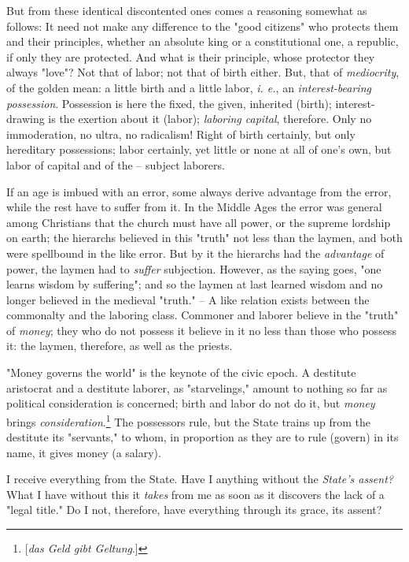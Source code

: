 But from these identical discontented ones comes a reasoning somewhat as 
follows: It need not make any difference to the "{}good citizens"{} who 
protects them and their principles, whether an absolute king or a 
constitutional one, a republic, if only they are protected. And what is their 
principle, whose protector they always "{}love"{}? Not that of labor; not that 
of birth either. But, that of \textit{mediocrity}, of the golden mean: a 
little birth and a little labor, \textit{i. e.}, an \textit{interest-bearing 
possession}. Possession is here the fixed, the given, inherited (birth); 
interest-drawing is the exertion about it (labor); \textit{laboring capital}, 
therefore. Only no immoderation, no ultra, no radicalism! Right of birth 
certainly, but only hereditary possessions; labor certainly, yet little or 
none at all of one's own, but labor of capital and of the -- subject laborers.

If an age is imbued with an error, some always derive advantage from the 
error, while the rest have to suffer from it. In the Middle Ages the error was 
general among Christians that the church must have all power, or the supreme 
lordship on earth; the hierarchs believed in this "{}truth"{} not less than 
the laymen, and both were spellbound in the like error. But by it the 
hierarchs had the \textit{advantage} of power, the laymen had to 
\textit{suffer} subjection. However, as the saying goes, "{}one learns wisdom 
by suffering"{}; and so the laymen at last learned wisdom and no longer 
believed in the medieval "{}truth."{} -- A like relation exists between the 
commonalty and the laboring class. Commoner and laborer believe in the 
"{}truth"{} of \textit{money}; they who do not possess it believe in it no 
less than those who possess it: the laymen, therefore, as well as the priests.

"{}Money governs the world"{} is the keynote of the civic epoch. A destitute 
aristocrat and a destitute laborer, as "{}starvelings,"{} amount to nothing so 
far as political consideration is concerned; birth and labor do not do it, but 
\textit{money} brings \textit{consideration}.\footnote{[\textit{das Geld gibt 
Geltung}.]} The possessors rule, but the State trains up from the destitute 
its "{}servants,"{} to whom, in proportion as they are to rule (govern) in its 
name, it gives money (a salary).

I receive everything from the State. Have I anything without the 
\textit{State's assent?} What I have without this it \textit{takes} from me as 
soon as it discovers the lack of a "{}legal title."{} Do I not, therefore, 
have everything through its grace, its assent?


